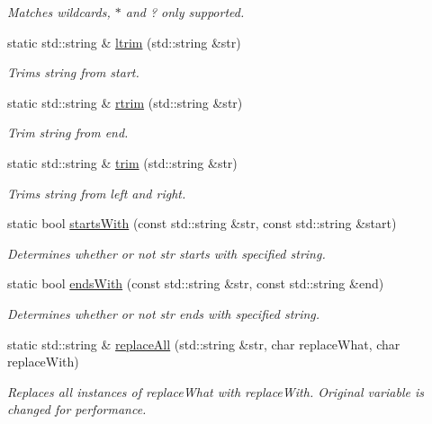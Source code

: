 \begin{DoxyCompactItemize}
\begin{DoxyCompactList}\small\item\em Matches wildcards, \textquotesingle{}$\ast$\textquotesingle{} and \textquotesingle{}?\textquotesingle{} only supported. \end{DoxyCompactList}\item 
static std\+::string \& \hyperlink{a00087_a64b7a841f04ed916ed8d234b8508703e}{ltrim} (std\+::string \&str)
\begin{DoxyCompactList}\small\item\em Trims string from start. \end{DoxyCompactList}\item 
static std\+::string \& \hyperlink{a00087_a9202797763e10861c4fa84ffd40198bb}{rtrim} (std\+::string \&str)
\begin{DoxyCompactList}\small\item\em Trim string from end. \end{DoxyCompactList}\item 
static std\+::string \& \hyperlink{a00087_aba0bc132c410fd3c1e128d1038e996ba}{trim} (std\+::string \&str)
\begin{DoxyCompactList}\small\item\em Trims string from left and right. \end{DoxyCompactList}\item 
static bool \hyperlink{a00087_acf80221cec72da701ef50995a61ab91f}{starts\+With} (const std\+::string \&str, const std\+::string \&start)
\begin{DoxyCompactList}\small\item\em Determines whether or not str starts with specified string. \end{DoxyCompactList}\item 
static bool \hyperlink{a00087_a5bcf5f6cc41a7ed683be115148579561}{ends\+With} (const std\+::string \&str, const std\+::string \&end)
\begin{DoxyCompactList}\small\item\em Determines whether or not str ends with specified string. \end{DoxyCompactList}\item 
static std\+::string \& \hyperlink{a00087_aa07bfda259ed194120b371401734ae86}{replace\+All} (std\+::string \&str, char replace\+What, char replace\+With)
\begin{DoxyCompactList}\small\item\em Replaces all instances of replace\+What with \textquotesingle{}replace\+With\textquotesingle{}. Original variable is changed for performance. \end{DoxyCompactList}\item 

\end{DoxyCompactItemize}

